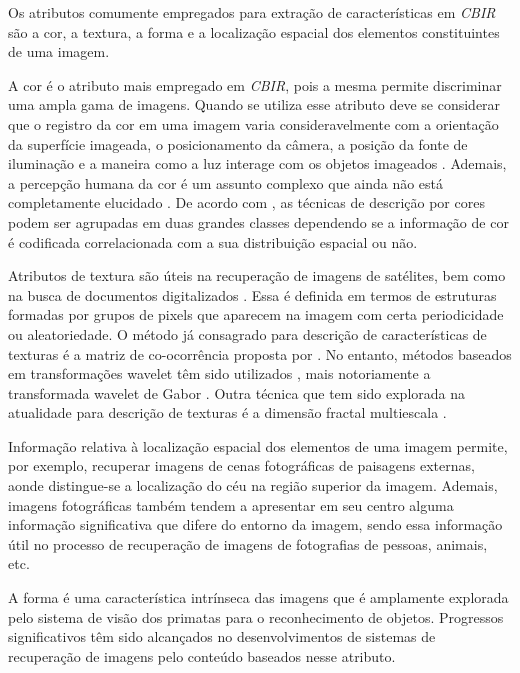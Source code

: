 Os atributos comumente empregados para extração de características em \emph{CBIR} são a cor, a textura, a forma e a localização espacial dos elementos constituintes de uma imagem. 

A cor é o atributo mais empregado em \emph{CBIR}, pois a mesma permite discriminar uma ampla gama de imagens. Quando se utiliza esse atributo deve se considerar que o registro da cor em uma imagem varia consideravelmente com a orientação da superfície imageada, o posicionamento da câmera, a posição da fonte de iluminação e a maneira como a luz interage com os objetos imageados \cite{Smeulders:2000}. Ademais, a percepção humana da cor é um assunto complexo que ainda não está completamente elucidado \cite{Smeulders:2000}. De acordo com , as técnicas de descrição por cores podem ser agrupadas em duas grandes classes dependendo se a informação de cor é codificada correlacionada com a sua distribuição espacial ou não. 

\begin{comment}Esses mesmos autores exemplificam como técnicas que não levam em consideração a distribuição espacial das cores os histogramas e os momentos de cores. 
\end{comment}

Atributos de textura são úteis na recuperação de imagens de satélites, bem como na busca de documentos digitalizados \cite{Smeulders:2000}. Essa é definida em termos de estruturas formadas por grupos de pixels que aparecem na imagem com certa periodicidade ou aleatoriedade. O método já consagrado para descrição de características de texturas é a matriz de co-ocorrência proposta por . No entanto, métodos baseados em transformações wavelet têm sido utilizados \cite{5376587}, mais notoriamente a transformada wavelet de Gabor \cite{531803}. Outra técnica que tem sido explorada na atualidade para descrição de texturas é a dimensão fractal multiescala \cite{Florindo:2013-2}. 

Informação relativa à localização espacial dos elementos de uma imagem permite, por exemplo, recuperar imagens de cenas fotográficas de paisagens externas, aonde distingue-se a localização do céu na região superior da imagem. Ademais, imagens fotográficas também tendem a apresentar em seu centro alguma informação significativa que difere do entorno da imagem, sendo essa informação útil no processo de recuperação de imagens de fotografias de pessoas, animais, etc.

A forma é uma característica intrínseca das imagens que é amplamente explorada pelo sistema de visão dos primatas para o reconhecimento de objetos. Progressos significativos têm sido alcançados no desenvolvimentos de sistemas de recuperação de imagens pelo conteúdo baseados nesse atributo.

